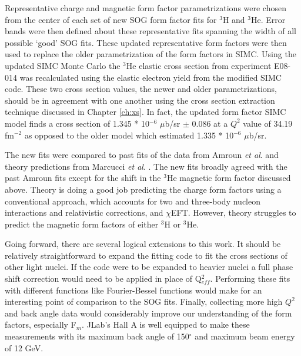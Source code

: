 Representative charge and magnetic form factor parametrizations were chosen from the center of each set of new SOG form factor fits for $^3$H and $^3$He. Error bands were then defined about these representative fits spanning the width of all possible `good' SOG fits. These updated representative form factors were then used to replace the older parametrization of the form factors in SIMC. Using the updated SIMC Monte Carlo the $^3$He elastic cross section from experiment E08-014 was recalculated using the elastic electron yield from the modified SIMC code. These two cross section values, the newer and older parametrizations, should be in agreement with one another using the cross section extraction technique discussed in Chapter \ref{ch:xs}. In fact, the updated form factor SIMC model finds a cross section of 1.345 * 10$^{-6}$ $\mu$b/sr $\pm$ 0.086 at a $Q^2$ value of 34.19 fm$^{-2}$ as opposed to the older model which estimated 1.335 * 10$^{-6}$ $\mu$b/sr.

The new fits were compared to past fits of the data from Amroun \textit{et al}. \cite{Article:Amroun} and theory predictions from Marcucci \textit{et al}. \cite{Article:Marcucci}. The new fits broadly agreed with the past Amroun fits except for the shift in the $^3$He magnetic form factor discussed above. Theory is doing a good job predicting the charge form factors using a conventional approach, which accounts for two and three-body nucleon interactions and relativistic corrections, and $\chi$EFT. However, theory struggles to predict the magnetic form factors of either $^3$H or $^3$He. 

Going forward, there are several logical extensions to this work. It should be relatively straightforward to expand the fitting code to fit the cross sections of other light nuclei. If the code were to be expanded to heavier nuclei a full phase shift correction would need to be applied in place of Q$^2_{eff}$. Performing these fits with different functions like Fourier-Bessel functions would make for an interesting point of comparison to the SOG fits. Finally, collecting more high $Q^2$ and back angle data would considerably improve our understanding of the form factors, especially F$_m$. JLab's Hall A is well equipped to make these measurements with its maximum back angle of 150$^{\circ}$ and maximum beam energy of 12 GeV.